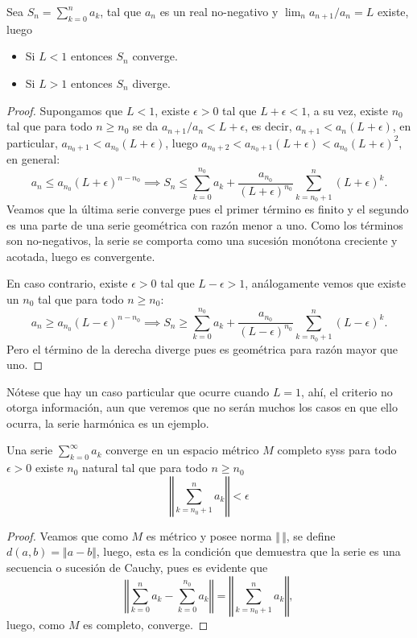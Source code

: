 \documentclass[11pt,oneside,a4paper]{book}
\begin{document}
\begin{thm}
Sea $S_n=\sum_{k=0}^n a_k$, tal que $a_n$ es un real no-negativo y $\lim_n a_{n+1}/a_n=L$ existe, luego
\begin{itemize}
\item Si $L\lt 1$ entonces $S_n$ converge.
\item Si $L\gt 1$ entonces $S_n$ diverge.
\end{itemize}
\end{thm}
\begin{proof}
Supongamos que $L\lt 1$, existe $\epsilon\gt 0$ tal que $L+\epsilon\lt 1$, a su vez, existe $n_0$ tal que para todo $n\geq n_0$ se da $a_{n+1}/a_n\lt L+\epsilon$, es decir, $a_{n+1}\lt a_n(L+\epsilon)$, en particular, $a_{n_0+1}\lt a_{n_0}(L+\epsilon)$, luego $a_{n_0+2}\lt a_{n_0+1}(L+\epsilon)\lt a_{n_0}(L+\epsilon)^2$, en general:
$$a_n\leq a_{n_0}(L+\epsilon)^{n-n_0}\implies S_n\leq\sum_{k=0}^{n_0}a_k+\frac{a_{n_0}}{(L+\epsilon)^{n_0}}\sum_{k=n_0+1}^n(L+\epsilon)^k.$$
Veamos que la última serie converge pues el primer término es finito y el segundo es una parte de una serie geométrica con razón menor a uno. Como los términos son no-negativos, la serie se comporta como una sucesión monótona creciente y acotada, luego es convergente.

En caso contrario, existe $\epsilon\gt 0$ tal que $L-\epsilon\gt 1$, análogamente vemos que existe un $n_0$ tal que para todo $n\geq n_0$:
$$a_n\geq a_{n_0}(L-\epsilon)^{n-n_0}\implies S_n\geq\sum_{k=0}^{n_0}a_k+\frac{a_{n_0}}{(L-\epsilon)^{n_0}}\sum_{k=n_0+1}^n(L-\epsilon)^k.$$
Pero el término de la derecha diverge pues es geométrica para razón mayor que uno.
\end{proof}
Nótese que hay un caso particular que ocurre cuando $L=1$, ahí, el criterio no otorga información, aun que veremos que no serán muchos los casos en que ello ocurra, la serie harmónica es un ejemplo.
\begin{thm}
Una serie $\sum_{k=0}^\infty a_k$ converge en un espacio métrico $M$ completo syss para todo $\epsilon\gt 0$ existe $n_0$ natural tal que para todo $n\geq n_0$
$$\left\Vert\sum_{k=n_0+1}^na_k\right\Vert\lt\epsilon$$
\end{thm}
\begin{proof}
Veamos que como $M$ es métrico y posee norma $\Vert\,\Vert$, se define $d(a,b)=\Vert a-b\Vert$, luego, esta es la condición que demuestra que la serie es una secuencia o sucesión de Cauchy, pues es evidente que
$$\left\Vert\sum_{k=0}^na_k-\sum_{k=0}^{n_0}a_k\right\Vert=\left\Vert\sum_{k=n_0+1}^na_k\right\Vert,$$
luego, como $M$ es completo, converge.
\end{proof}
\end{document}
